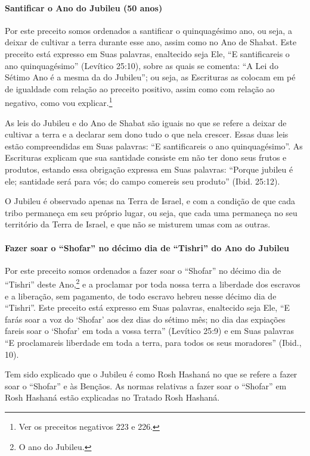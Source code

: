 \paragraph{Santificar o Ano do Jubileu (50 anos)}

Por este preceito somos ordenados a santificar o quinquagésimo ano, ou
seja, a deixar de cultivar a terra durante esse ano, assim como no Ano
de Shabat. Este preceito está expresso em Suas palavras, enaltecido seja
Ele, ``E santificareis o ano quinquagésimo'' (Levítico 25:10), sobre as
quais se comenta: ``A Lei do Sétimo Ano é a mesma da do Jubileu''; ou
seja, as Escrituras as colocam em pé de igualdade com relação ao preceito positivo, assim como com relação ao negativo, como vou explicar.\footnote{Ver os preceitos negativos 223 e 226.}

As leis do Jubileu e do Ano de Shabat são iguais no que se refere a
deixar de cultivar a terra e a declarar sem dono tudo o que nela crescer. Essas
duas leis estão compreendidas em Suas palavras: ``E santificareis o ano
quinquagésimo''. As Escrituras explicam que sua santidade consiste em
não ter dono seus frutos e produtos, estando essa obrigação expressa em
Suas palavras: ``Porque jubileu é ele; santidade será para vós; do
campo comereis seu produto'' (Ibid. 25:12).

O Jubileu é observado apenas na Terra de Israel, e com a condição de que
cada tribo permaneça em seu próprio lugar, ou seja, que cada uma
permaneça no seu território da Terra de Israel, e que não se misturem
umas com as outras.

\paragraph{Fazer soar o ``Shofar'' no décimo dia de ``Tishri'' do Ano do Jubileu}

Por este preceito somos ordenados a fazer soar o ``Shofar'' no décimo
dia de ``Tishri'' deste Ano,\footnote{O ano do Jubileu.} e a proclamar por
toda nossa terra a liberdade dos escravos e a liberação, sem pagamento,
de todo escravo hebreu nesse décimo dia de ``Tishri''. Este preceito
está expresso em Suas palavras, enaltecido seja Ele, ``E farás soar a
voz do `Shofar' aos dez dias do sétimo mês; no dia das expiações fareis
soar o `Shofar' em toda a vossa terra'' (Levítico 25:9) e em Suas
palavras ``E proclamareis liberdade em toda a terra, para todos os seus
moradores'' (Ibid., 10).

Tem sido explicado que o Jubileu é como Rosh Hashaná no que se refere a
fazer soar o ``Shofar'' e às Bençãos. As normas relativas a fazer soar o
``Shofar'' em Rosh Hashaná estão explicadas no Tratado Rosh Hashaná.

